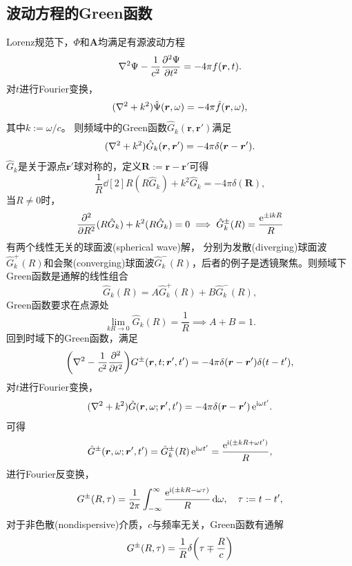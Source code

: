 \subsection{波动方程的Green函数}
Lorenz规范下，$\Phi$和$\bm A$均满足有源波动方程
\begin{equation}
    \label{eqn:DAlembertianPsi=4pif}
    \laplacian\Psi - \frac1{c^2}\pv[2]\Psi t = -4\pi f(\bm r,t).
\end{equation}
对$t$进行Fourier变换，%
\[
    (\laplacian + k^2)\hat\Psi(\bm r,\omega) = -4\pi\hat f(\bm r,\omega),
\]
其中$k := \omega/c$。
则频域中的Green函数$\hat G_k(\bm r,\bm r')$满足
\begin{equation}
    \label{eq:ed-helmholtz-green-source}
    (\laplacian + k^2)\hat G_k(\bm r,\bm r') = -4\pi\delta(\bm r - \bm r').
\end{equation}
$\hat G_k$是关于源点$\bm r'$球对称的，定义$\bm R := \bm r - \bm r'$可得
\[
    \frac1R\dd[2]R(R\hat G_k) + k^2\hat G_k = -4\pi\delta(\bm R),
\]
当$R \neq 0$时，
\[
    \pp[2]R(R\hat G_k) + k^2(R\hat G_k) = 0 \implies \hat G_k^\pm(R) = \frac{\e^{\pm\i kR}}R
\]
有两个线性无关的球面波(spherical wave)解，
分别为发散(diverging)球面波$\hat G_k^+(R)$和会聚(converging)球面波$\hat G_k^-(R)$，后者的例子是透镜聚焦。则频域下Green函数是通解的线性组合
\[
    \hat G_k(R) = A\hat G_k^+(R) + B\hat G_k^-(R),
\]
Green函数要求在点源处
\[
    \lim_{kR\to0}\hat G_k(R) = \frac1R \implies A + B = 1.
\]
回到时域下的Green函数，满足
\begin{equation}
    \label{eq:ed-wave-green-source}
    \biggp{\laplacian - \frac1{c^2}\pp[2]t}G^\pm(\bm r,t;\bm r',t') = -4\pi\delta(\bm r - \bm r')\delta(t - t'),
\end{equation}
对$t$进行Fourier变换， 
\[
    (\laplacian + k^2)\hat G(\bm r,\omega;\bm r',t') = -4\pi\delta(\bm r - \bm r')\e^{\i\omega t'}.
\]
可得 
\[
    \hat G^\pm(\bm r,\omega;\bm r',t') = \hat G_k^\pm(R)\e^{\i\omega t'} = \frac{\e^{\i(\pm kR+\omega t')}}R,
\]
进行Fourier反变换，
\[
    G^\pm(R,\tau) = \frac1{2\pi}\intR\frac{\e^{\i(\pm kR-\omega\tau)}}R\d\omega,\quad\tau := t - t',
\]
对于非色散(nondispersive)介质，$c$与频率无关，Green函数有通解
\begin{equation}
    \label{eq:ed-causal-wave-green}
    G^\pm(R,\tau) = \frac1R\delta\biggp{\tau \mp \frac Rc}
\end{equation}
